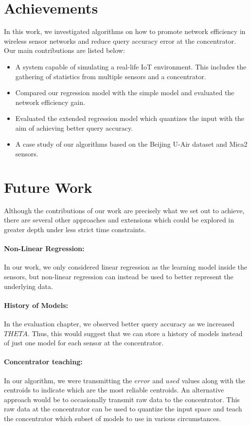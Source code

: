 \documentclass{mproj}
\begin{document}
\section{Achievements}
In this work, we investigated algorithms on how to promote network efficiency in wireless sensor networks and reduce query accuracy error at the concentrator. Our main contributions are listed below:
\begin{itemize}
\item A system capable of simulating a real-life IoT environment. This includes the gathering of statistics from multiple sensors and a concentrator.
\item Compared our regression model with the simple model and evaluated the network efficiency gain.
\item Evaluated the extended regression model which quantizes the input with the aim of achieving better query accuracy.
\item A case study of our algorithms based on the Beijing U-Air dataset\cite{air-quality-inference-meets-big-data} and Mica2\cite{adaptiveDataForwarding} sensors.
\end{itemize}

\section{Future Work}
Although the contributions of our work are precisely what we set out to achieve, there are several other approaches and extensions which could be explored in greater depth under less strict time constraints.

\paragraph{Non-Linear Regression:}In our work, we only considered linear regression as the learning model inside the sensors, but non-linear regression can instead be used to better represent the underlying data. 
\paragraph{History of Models:}In the evaluation chapter, we observed better query accuracy as we increased $THETA$. Thus, this would suggest that we can store a history of models instead of just one model for each sensor at the concentrator.
\paragraph{Concentrator teaching:}In our algorithm, we were transmitting the $error$ and $used$ values along with the centroids to indicate which are the most reliable centroids. An alternative approach would be to occasionally transmit raw data to the concentrator. This raw data at the concentrator can be used to quantize the input space and teach the concentrator which subset of models to use in various circumstances.
\end{document}

